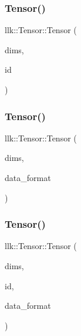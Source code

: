 \mbox{\label{classllk_1_1Tensor_a328c405eea14680ceb9dfaf56bbbd1e3}} 
\subsubsection{\texorpdfstring{Tensor()}{Tensor()}\hspace{0.1cm}{\footnotesize\ttfamily [5/8]}}
{\footnotesize\ttfamily llk\+::\+Tensor\+::\+Tensor (\begin{DoxyParamCaption}\item[{\hyperlink{structllk_1_1TensorDims}{Tensor\+Dims}}]{dims,  }\item[{int}]{id }\end{DoxyParamCaption})}

\mbox{\label{classllk_1_1Tensor_ade260687d190ff78582a6c97e9d39445}} 
\subsubsection{\texorpdfstring{Tensor()}{Tensor()}\hspace{0.1cm}{\footnotesize\ttfamily [6/8]}}
{\footnotesize\ttfamily llk\+::\+Tensor\+::\+Tensor (\begin{DoxyParamCaption}\item[{\hyperlink{structllk_1_1TensorDims}{Tensor\+Dims}}]{dims,  }\item[{Data\+Format}]{data\+\_\+format }\end{DoxyParamCaption})}

\mbox{\label{classllk_1_1Tensor_ac7d05556590a616bbd1e913cefd5300a}} 
\subsubsection{\texorpdfstring{Tensor()}{Tensor()}\hspace{0.1cm}{\footnotesize\ttfamily [7/8]}}
{\footnotesize\ttfamily llk\+::\+Tensor\+::\+Tensor (\begin{DoxyParamCaption}\item[{\hyperlink{structllk_1_1TensorDims}{Tensor\+Dims}}]{dims,  }\item[{int}]{id,  }\item[{Data\+Format}]{data\+\_\+format }\end{DoxyParamCaption})}

